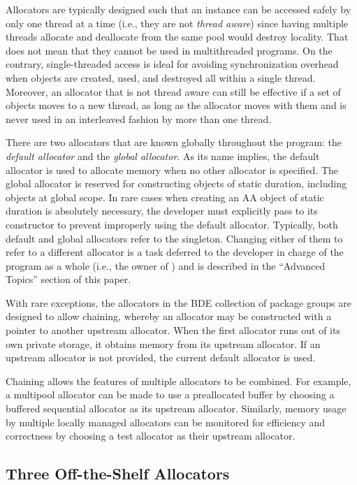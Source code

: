 Allocators are typically designed such that an instance can be accessed safely
by only one thread at a time (i.e., they are not \emph{thread aware}) since having
multiple threads allocate and deallocate from the same pool would destroy
locality. That does not mean that they cannot be used in multithreaded
programs. On the contrary, single-threaded access is ideal for avoiding
synchronization overhead when objects are created, used, and destroyed all
within a single thread. Moreover, an allocator that is not thread aware can still
be effective if a set of objects moves to a new thread, as long as the allocator
moves with them and is never used in an interleaved fashion by more than one
thread.

There are two allocators that are known globally throughout the program: the
\emph{default allocator} and the \emph{global allocator}. As its name implies, the default
allocator is used to allocate memory when no other allocator is specified. The
global allocator is reserved for constructing objects of static duration, including
objects at global scope. In rare cases when creating an AA object of static
duration is absolutely necessary, the developer must explicitly pass
 to its constructor to prevent improperly
using the default allocator. Typically, both default and global allocators refer to
the  singleton. Changing either of them to refer to a
different allocator is a task deferred to the developer in charge of the program
as a whole (i.e., the owner of ) and is described in the “Advanced Topics”
section of this paper.

With rare exceptions, the allocators in the BDE collection of package groups
are designed to allow chaining, whereby an allocator may be constructed with a
pointer to another upstream allocator. When the first allocator runs out of its
own private storage, it obtains memory from its upstream allocator. If an
upstream allocator is not provided, the current default allocator is used.

Chaining allows the features of multiple allocators to be combined. For
example, a multipool allocator can be made to use a preallocated buffer by
choosing a buffered sequential allocator as its upstream allocator. Similarly,
memory usage by multiple locally managed allocators can be monitored for
efficiency and correctness by choosing a test allocator as their upstream
allocator.

\subsection{Three Off-the-Shelf Allocators}

